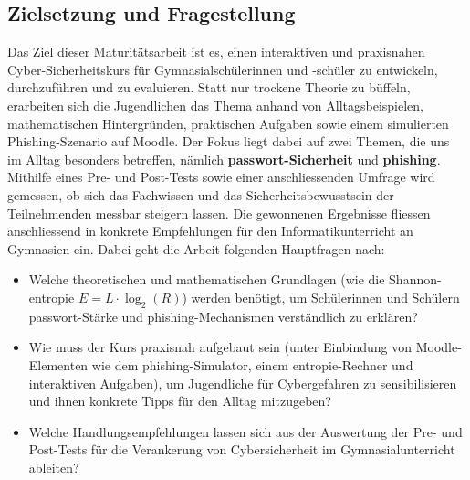 \documentclass[12pt,a4paper]{article}
\begin{document}
\subsection{Zielsetzung und Fragestellung}
Das Ziel dieser Maturitätsarbeit ist es, einen interaktiven und praxisnahen Cyber-\newline Sicherheitskurs für Gymnasialschülerinnen und -schüler zu entwickeln, \newline durchzuführen und zu evaluieren. Statt nur trockene Theorie zu büffeln, erarbeiten sich die Jugendlichen das Thema anhand von Alltagsbeispielen, mathematischen \mbox{Hintergründen,} praktischen Aufgaben sowie einem simulierten Phishing-Szenario auf Moodle. \newline Der Fokus liegt dabei auf zwei Themen, die uns im Alltag besonders betreffen, nämlich \mbox{\textbf{\gls{passwort}-Sicherheit}} und \textbf{\gls{phishing}}. \newline Mithilfe eines Pre- und Post-Tests sowie einer anschliessenden Umfrage wird gemessen, ob sich das Fachwissen und das Sicherheitsbewusstsein der Teilnehmenden messbar steigern lassen. Die gewonnenen Ergebnisse fliessen anschliessend in konkrete Empfehlungen für den Informatikunterricht an Gymnasien ein. Dabei geht die Arbeit folgenden Hauptfragen nach:
\begin{itemize}
\item Welche theoretischen und mathematischen Grundlagen (wie die Shannon-\gls{entropie} $E = L \cdot \log_2(R)$) werden benötigt, um Schülerinnen und Schülern \gls{passwort}-Stärke und \gls{phishing}-Mechanismen verständlich zu erklären?
\item Wie muss der Kurs praxisnah aufgebaut sein (unter Einbindung von Moodle-Elementen wie dem \gls{phishing}-Simulator, einem \gls{entropie}-Rechner und interaktiven Aufgaben), um Jugendliche für Cybergefahren zu sensibilisieren und ihnen konkrete Tipps für den Alltag mitzugeben?
\item Welche Handlungsempfehlungen lassen sich aus der Auswertung der Pre- und Post-Tests für die Verankerung von Cybersicherheit im Gymnasialunterricht ableiten?
\end{itemize}

\newpage
\end{document}
